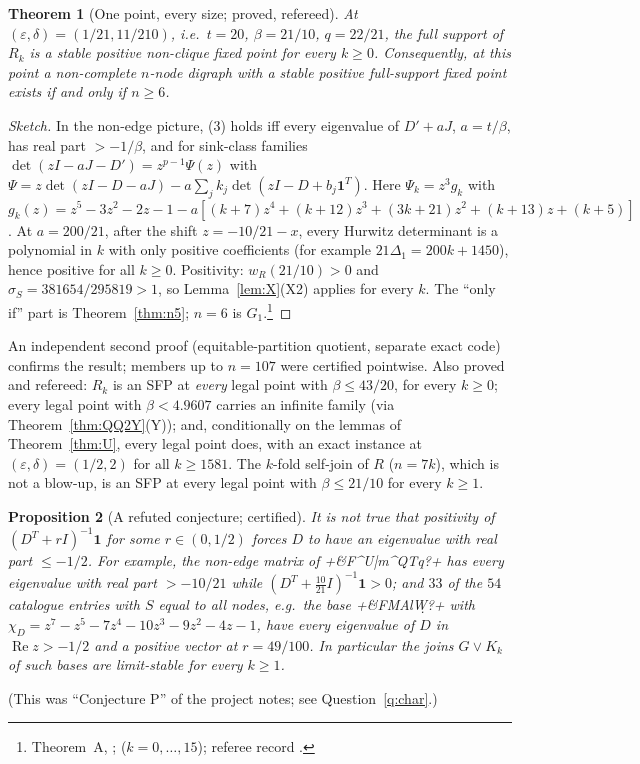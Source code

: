 \documentclass[11pt]{article}
\newtheorem{theorem}{Theorem}[section]
\newtheorem{proposition}[theorem]{Proposition}
\theoremstyle{definition}
\newcommand{\one}{\mathbf{1}}
\newcommand{\eps}{\varepsilon}
\newcommand{\Rea}{\operatorname{Re}}
\begin{document}
\begin{theorem}[One point, every size; proved, refereed]\label{thm:A}
At $(\eps,\delta)=(1/21,11/210)$, i.e.\ $t=20$, $\beta=21/10$, $q=22/21$, the full support of $R_k$ is a stable positive non-clique
fixed point for every $k\ge0$. Consequently, at this point a non-complete $n$-node digraph with a stable positive full-support fixed
point exists if and only if $n\ge6$.
\end{theorem}
\begin{proof}[Sketch]
In the non-edge picture, (3) holds iff every eigenvalue of $D'+aJ$, $a=t/\beta$, has real part $>-1/\beta$, and for sink-class
families $\det(zI-aJ-D')=z^{p-1}\Psi(z)$ with $\Psi=z\det(zI-D-aJ)-a\sum_jk_j\det(zI-D+b_j\one^T)$. Here $\Psi_k=z^3g_k$ with
$g_k(z)=z^5-3z^2-2z-1-a[(k+7)z^4+(k+12)z^3+(3k+21)z^2+(k+13)z+(k+5)]$. At $a=200/21$, after the shift $z=-10/21-x$, every Hurwitz
determinant is a polynomial in $k$ with only positive coefficients (for example $21\Delta_1=200k+1450$), hence positive for all
$k\ge0$. Positivity: $w_R(21/10)>0$ and $\sigma_S=381654/295819>1$, so Lemma~\ref{lem:X}(X2) applies for every $k$. The
``only if'' part is Theorem~\ref{thm:n5}; $n=6$ is $G_1$.\footnote{Theorem~A, ;  ($k=0,\dots,15$); referee record .}
\end{proof}
An independent second proof (equitable-partition quotient, separate exact code) confirms the result; members up to $n=107$
were certified pointwise. Also proved and refereed:
$R_k$ is an SFP at \emph{every} legal point with $\beta\le43/20$, for every $k\ge0$; every legal point with $\beta<4.9607$ carries an
infinite family (via Theorem~\ref{thm:QQ2Y}(Y)); and, conditionally on the lemmas of Theorem~\ref{thm:U}, every legal point
does, with an exact instance at $(\eps,\delta)=(1/2,2)$ for all $k\ge1581$. The $k$-fold self-join of $R$ ($n=7k$), which is not a
blow-up, is an SFP at every legal point with $\beta\le21/10$ for every $k\ge1$.

\begin{proposition}[A refuted conjecture; certified]\label{prop:P}
It is not true that positivity of $(D^T+rI)^{-1}\one$ for some $r\in(0,1/2)$ forces $D$ to have an eigenvalue with real part
$\le-1/2$. For example, the non-edge matrix of \dsix+&F^U|m^QTq?+ has every eigenvalue with real part $>-10/21$ while
$(D^T+\tfrac{10}{21}I)^{-1}\one>0$; and $33$ of the $54$ catalogue entries with $S$ equal to all nodes, e.g.\ the base \dsix+&FMAlW\d\y?+ with
$\chi_D=z^7-z^5-7z^4-10z^3-9z^2-4z-1$, have every eigenvalue of $D$ in $\Rea z>-1/2$ and a positive vector at $r=49/100$. In
particular the joins $G\vee K_k$ of such bases are limit-stable for every $k\ge1$.
\end{proposition}
(This was ``Conjecture P'' of the project notes; see Question~\ref{q:char}.)
\end{document}
